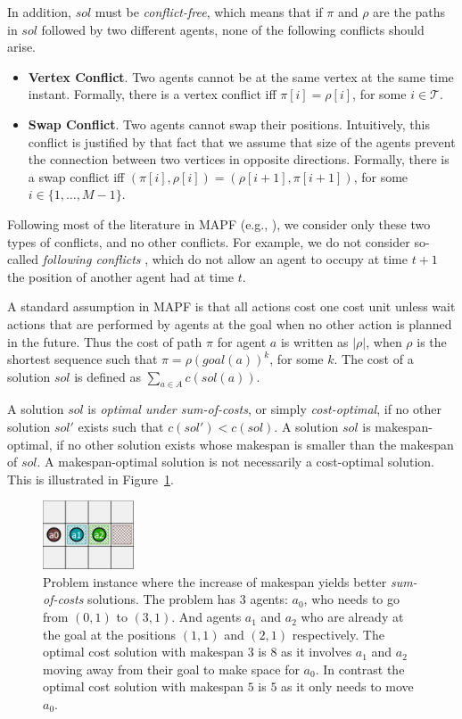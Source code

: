 In addition, $sol$ must be \emph{conflict-free}, which means that if $\pi$ and $\rho$ are the paths in $sol$ followed by two different agents, none of the following conflicts should arise.
\begin{itemize}
    \item \textbf{Vertex Conflict}. Two agents cannot be at the same vertex at the same time instant. Formally, there is a vertex conflict iff $\pi[i]=\rho[i]$, for some $i\in\mathcal{T}$.
    \item \textbf{Swap Conflict}. Two agents cannot swap their positions. Intuitively, this conflict is justified by that fact that we assume that size of the agents prevent the connection between two vertices in opposite directions. Formally, there is a swap conflict iff $(\pi[i],\rho[i])=(\rho[i+1],\pi[i+1])$, for some $i\in\{1,\ldots,M-1\}$.
\end{itemize}
Following most of the literature in MAPF (e.g., ), we consider only these two types of conflicts, and no other conflicts. For example, we do not consider so-called \emph{following conflicts} \cite{SternSFK0WLA0KB19}, which do not allow an agent to occupy at time $t+1$ the position of another agent had at time $t$.

A standard assumption in MAPF is that all actions cost one cost unit unless wait actions that are performed by agents at the goal when no other action is planned in the future. Thus the cost of path $\pi$ for agent $a$ is written as $|\rho|$, when $\rho$ is the shortest sequence such that $\pi=\rho(goal(a))^k$, for some $k$. The cost of a solution $sol$ is defined as $\sum_{a\in A} c(sol(a))$.

A solution $sol$ is \emph{optimal under sum-of-costs}, or simply \emph{cost-optimal}, if no other solution $sol'$ exists such that $c(sol')<c(sol)$. A solution $sol$ is makespan-optimal, if no other solution exists whose makespan is smaller than the makespan of $sol$. A makespan-optimal solution is not necessarily a cost-optimal solution. This is illustrated in Figure~\ref{fig:makespancost}.

\begin{figure}
    \centering
    \includegraphics[width=0.24\textwidth]{graphs/makespangrid.PNG}
      \caption{Problem instance where the increase of makespan yields better \emph{sum-of-costs} solutions. The problem has 3 agents:  $a_0$, who needs to go from $(0,1)$ to $(3,1)$. And agents $a_1$ and $a_2$ who are already at the goal at the positions $(1,1)$ and $(2,1)$ respectively. The optimal cost solution with makespan $3$ is $8$ as it involves $a_1$ and $a_2$ moving away from their goal to make space for $a_0$. In contrast the optimal cost solution with makespan $5$ is $5$ as it only needs to move $a_0$.}
    \label{fig:makespancost}
\end{figure}



